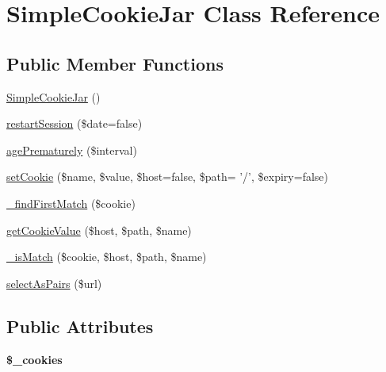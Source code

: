\hypertarget{class_simple_cookie_jar}{
\section{SimpleCookieJar Class Reference}
\label{class_simple_cookie_jar}
}
\subsection*{Public Member Functions}
\begin{DoxyCompactItemize}
\item 
\hyperlink{class_simple_cookie_jar_aa0adab8ed09f77f6826e6c37d9f2e0fc}{SimpleCookieJar} ()
\item 
\hyperlink{class_simple_cookie_jar_aa31bb3d759c78564f9390a21d39bbc41}{restartSession} (\$date=false)
\item 
\hyperlink{class_simple_cookie_jar_ab196bbf77b5906ace88b09db7bb004c3}{agePrematurely} (\$interval)
\item 
\hyperlink{class_simple_cookie_jar_ac467b7bc604554da9133be361b32e803}{setCookie} (\$name, \$value, \$host=false, \$path= '/', \$expiry=false)
\item 
\hyperlink{class_simple_cookie_jar_ae6446b13958595cbd1ab43dff09ff0f2}{\_\-findFirstMatch} (\$cookie)
\item 
\hyperlink{class_simple_cookie_jar_a8c8f383919cd80b15c74afc43d0cb189}{getCookieValue} (\$host, \$path, \$name)
\item 
\hyperlink{class_simple_cookie_jar_ac14534e705b8c5cad177c11a9fc732a1}{\_\-isMatch} (\$cookie, \$host, \$path, \$name)
\item 
\hyperlink{class_simple_cookie_jar_abb79fd222ce94e548543061b50a291f3}{selectAsPairs} (\$url)
\end{DoxyCompactItemize}
\subsection*{Public Attributes}
\begin{DoxyCompactItemize}
\item 
\hypertarget{class_simple_cookie_jar_a7138f3fa6cc073d246510ab0bd1786d6}{
{\bfseries \$\_\-cookies}}
\label{class_simple_cookie_jar_a7138f3fa6cc073d246510ab0bd1786d6}

\end{DoxyCompactItemize}


